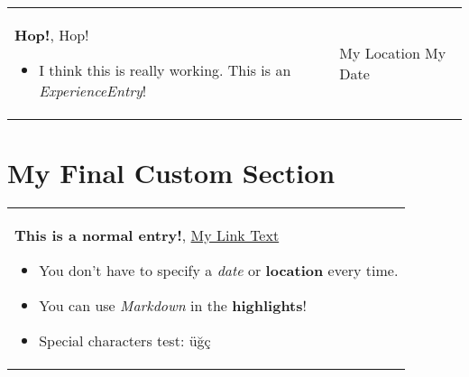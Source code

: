 \documentclass[10pt, a4paper]{article}
\newenvironment{highlights}{
        \begin{itemize}[
                topsep=0pt,
                parsep=0.10 cm,
                partopsep=0pt,
                itemsep=0pt,
                after=\vspace{-1\baselineskip},
                leftmargin=0.4 cm + 3pt
            ]
    }{
        \end{itemize}
    } %
\let\hrefWithoutArrow\href
\renewcommand{\href}[2]{\hrefWithoutArrow{#1}{#2 \raisebox{.15ex}{\footnotesize \faExternalLink*}}}
\begin{document}
        \begin{tabularx}{ cm-0.13cm}{K{0.2 cm} R{3.6 cm}}
            \textbf{Hop!}, Hop!
            \vspace{0.10 cm}
            \begin{highlights}
                \item I think this is really working. This is an \textit{ExperienceEntry}! \hspace*{-0.2cm}
            \end{highlights}
        &
            My Location \newline
            My Date
        \end{tabularx}



    \section{My Final Custom Section}
    
        \begin{tabularx}{ cm-0.13cm}{K{0.2 cm}}
            \textbf{This is a normal entry!}, \href{https://example.com/}{My Link Text}
            \vspace{0.10 cm}
            \begin{highlights}
                \item You don't have to specify a \textit{date} or \textbf{location} every time. 
                \item You can use \textit{Markdown} in the \textbf{highlights}! 
                \item Special characters test: üğç \hspace*{-0.2cm}
            \end{highlights}
        \end{tabularx}
\end{document}
